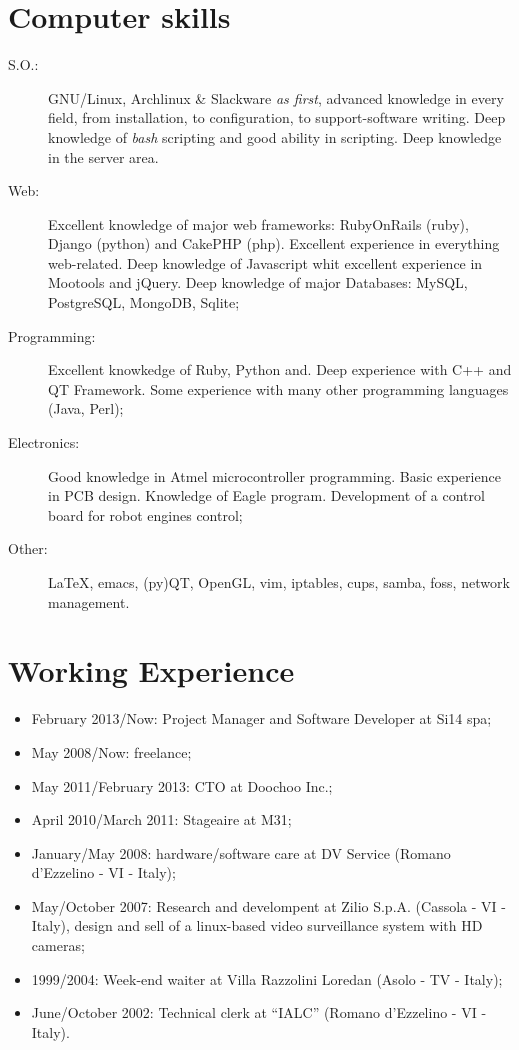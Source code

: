 \documentclass[pdftex, a4paper, 11pt]{article}
\begin{document}
\section*{Computer skills}
\begin{description}
\item[S.O.:] GNU/Linux, Archlinux \& Slackware {\em as first}, advanced knowledge
  in every field, from installation, to configuration, to support-software
  writing. Deep knowledge of {\em bash} scripting and good ability in scripting.
  Deep knowledge in the server area.
\item[Web:] Excellent knowledge of major web frameworks: RubyOnRails (ruby),
  Django (python) and CakePHP (php).
  Excellent experience in 
  everything web-related. 
  Deep knowledge of Javascript whit excellent experience in Mootools and jQuery.
  Deep knowledge of major Databases: MySQL, PostgreSQL, MongoDB, Sqlite;
\item[Programming:] Excellent knowkedge of Ruby, Python and. Deep experience with C++ and QT Framework. Some experience with many other programming
  languages (Java, Perl);
\item[Electronics:] Good knowledge in Atmel microcontroller programming. Basic experience
  in PCB design. Knowledge of Eagle program. Development of a control board for robot
  engines control;
\item[Other:] \LaTeX, emacs, (py)QT, OpenGL, vim, iptables, cups,
  samba, foss, network management.
\end{description}

\section*{Working Experience}
\begin{itemize}
\item February 2013/Now: Project Manager and Software Developer at Si14 spa;
\item May 2008/Now: freelance;
\item May 2011/February 2013: CTO at Doochoo Inc.;
\item April 2010/March 2011: Stageaire at M31;
\item January/May 2008: hardware/software care at DV Service (Romano d'Ezzelino - VI - Italy);
\item May/October 2007: Research and develompent at Zilio
  S.p.A. (Cassola - VI - Italy), design and sell of a linux-based video surveillance
  system with HD cameras;
\item 1999/2004: Week-end waiter at Villa Razzolini Loredan (Asolo - TV - Italy);
\item June/October 2002: Technical clerk at ``IALC'' (Romano d'Ezzelino - VI - Italy).
\end{itemize}
\end{document}
